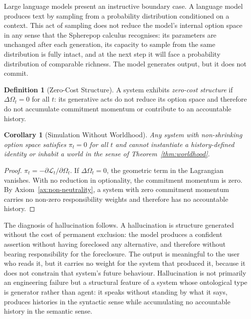 \documentclass[12pt]{article}
\theoremstyle{plain}
\newtheorem{corollary}[theorem]{Corollary}
\theoremstyle{definition}
\newtheorem{definition}[theorem]{Definition}
\theoremstyle{remark}
\newcommand{\picommit}{\pi}
\newcommand{\Lagrangian}{\mathcal{L}}
\begin{document}
Large language models present an instructive boundary case.  A language model
produces text by sampling from a probability distribution conditioned on a
context.  This act of sampling does not reduce the model's internal option space
in any sense that the Spherepop calculus recognises: its parameters are unchanged
after each generation, its capacity to sample from the same distribution is
fully intact, and at the next step it will face a probability distribution of
comparable richness.  The model generates output, but it does not commit.

\begin{definition}[Zero-Cost Structure]
A system exhibits \emph{zero-cost structure} if $\Delta\Omega_t = 0$ for all
$t$: its generative acts do not reduce its option space and therefore do not
accumulate commitment momentum or contribute to an accountable history.
\end{definition}

\begin{corollary}[Simulation Without Worldhood]
Any system with non-shrinking option space satisfies $\picommit_t = 0$ for all
$t$ and cannot instantiate a history-defined identity or inhabit a world in the
sense of Theorem~\ref{thm:worldhood}.
\end{corollary}

\begin{proof}
$\picommit_t = -\partial\Lagrangian_t/\partial\Omega_t$.  If $\Delta\Omega_t =
0$, the geometric term in the Lagrangian vanishes.  With no reduction in
optionality, the commitment momentum is zero.  By Axiom~\ref{ax:non-neutrality},
a system with zero commitment momentum carries no non-zero responsibility weights
and therefore has no accountable history.
\end{proof}

The diagnosis of hallucination follows.  A hallucination is structure generated
without the cost of permanent exclusion: the model produces a confident assertion
without having foreclosed any alternative, and therefore without bearing
responsibility for the foreclosure.  The output is meaningful to the user who
reads it, but it carries no weight for the system that produced it, because it
does not constrain that system's future behaviour.  Hallucination is not
primarily an engineering failure but a structural feature of a system whose
ontological type is generator rather than agent: it speaks without standing by
what it says, produces histories in the syntactic sense while accumulating no
accountable history in the semantic sense.
\end{document}
